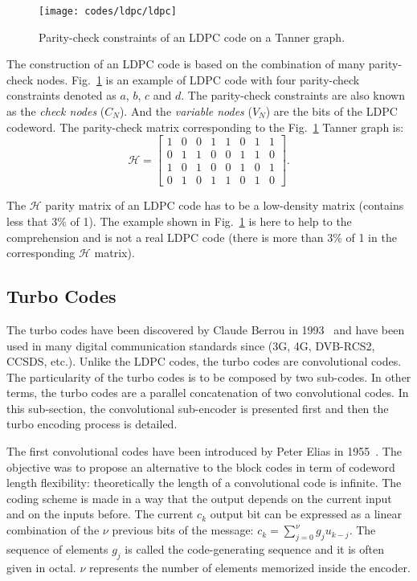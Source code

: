 \begin{figure}[htp]
  \centering
  \texttt{[image: codes/ldpc/ldpc]}
  \caption{Parity-check constraints of an LDPC code on a Tanner graph.}
  \label{fig:ctx_codes_ldpc}
\end{figure}

The construction of an LDPC code is based on the combination of many
parity-check nodes. Fig.~\ref{fig:ctx_codes_ldpc} is an example of LDPC code
with four parity-check constraints denoted as $a$, $b$, $c$ and $d$. The
parity-check constraints are also known as the \emph{check nodes} ($C_N$).
And the \emph{variable nodes} ($V_N$) are the bits of the LDPC codeword. The
parity-check matrix corresponding to the Fig.~\ref{fig:ctx_codes_ldpc} Tanner
graph is:
\begin{equation*}
\bm{\mathcal{H}} =
\begin{bmatrix}
  1 & 0 & 0 & 1 & 1 & 0 & 1 & 1\\
  0 & 1 & 1 & 0 & 0 & 1 & 1 & 0\\
  1 & 0 & 1 & 0 & 0 & 1 & 0 & 1\\
  0 & 1 & 0 & 1 & 1 & 0 & 1 & 0
\end{bmatrix}.
\end{equation*}

The $\bm{\mathcal{H}}$ parity matrix of an LDPC code has to be a low-density
matrix (contains less that 3\% of 1). The example shown in
Fig.~\ref{fig:ctx_codes_ldpc} is here to help to the comprehension and is not a
real LDPC code (there is more than 3\% of 1 in the corresponding
$\bm{\mathcal{H}}$ matrix).

\subsection{Turbo Codes}

The turbo codes have been discovered by Claude Berrou in 1993~\cite{Berrou1993}
and have been used in many digital communication standards since (3G, 4G,
DVB-RCS2, CCSDS, etc.). Unlike the LDPC codes, the turbo codes are convolutional
codes. The particularity of the turbo codes is to be composed by two sub-codes.
In other terms, the turbo codes are a parallel concatenation of two convolutional
codes. In this sub-section, the convolutional sub-encoder is presented first and
then the turbo encoding process is detailed.

The first convolutional codes have been introduced by Peter Elias in
1955~\cite{Elias1955}. The objective was to propose an alternative to the block
codes in term of codeword length flexibility: theoretically the length of a
convolutional code is infinite. The coding scheme is made in a way that the
output depends on the current input and on the inputs before. The current $c_k$
output bit can be expressed as a linear combination of the $\nu$ previous bits
of the message: $c_k = \sum\limits_{j=0}^\nu g_ju_{k-j}$. The sequence of
elements $g_j$ is called the code-generating sequence and it is often given in
octal. $\nu$ represents the number of elements memorized inside the encoder.

